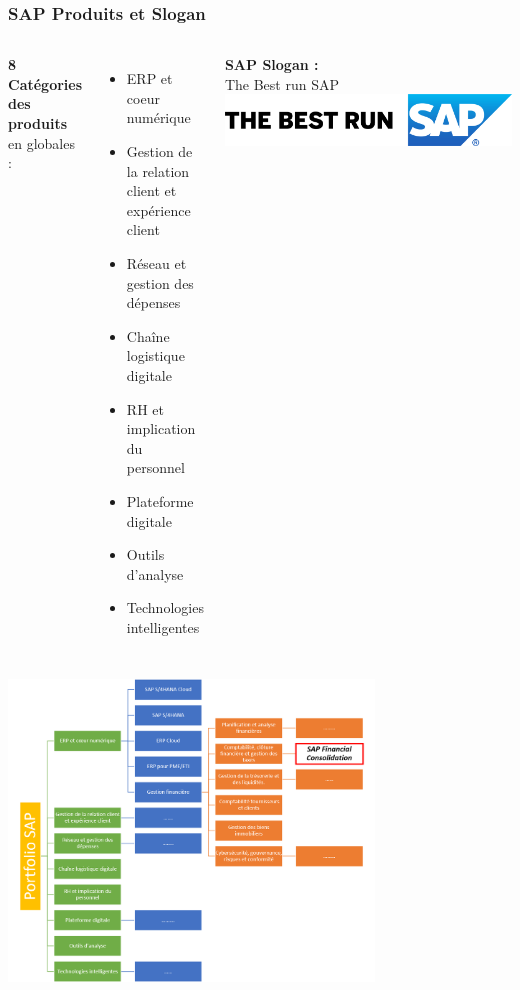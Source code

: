 \documentclass{beamer}
\begin{document}
        \begin{frame}
            \frametitle{SAP Produits et Slogan}
            \begin{columns}[t]
                    \textbf{8 Catégories des produits} en globales : 
                    \begin{itemize}
                        \item ERP et coeur numérique
                        \item Gestion de la relation client et expérience client
                        \item Réseau et gestion des dépenses
                        \item Chaîne logistique digitale
                        \item RH et implication du personnel
                        \item Plateforme digitale
                        \item Outils d’analyse
                        \item Technologies intelligentes
                    \end{itemize}
            \textbf{SAP Slogan :} \\ The Best run SAP
            \flushleft
            \includegraphics[width=\textwidth]{SAP_Best_R_grad_blk.jpg}
            \end{columns}
        \end{frame}
        
        \begin{frame}
            \includegraphics[height=8cm]{SAP_portfolio.png}
        \end{frame}
        
\end{document}

